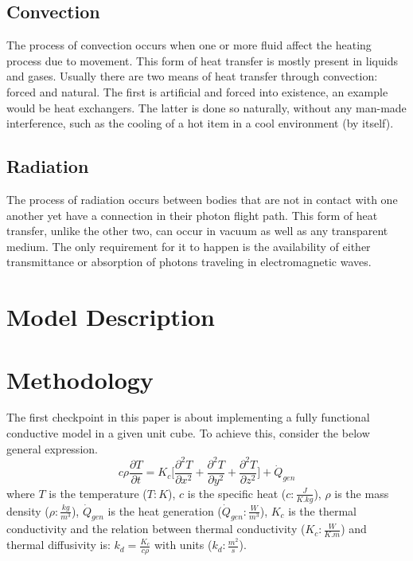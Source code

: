 \documentclass[a4paper,10pt]{IEEEtran}
\begin{document}
	\subsection{Convection}
	The process of convection occurs when one or more fluid affect the heating process due to movement. This form of heat transfer is mostly present in liquids and gases. Usually there are two means of heat transfer through convection: forced and natural. The first is artificial and forced into existence, an example would be heat exchangers. The latter is done so naturally, without any man-made interference, such as the cooling of a hot item in a cool environment (by itself). 
	\subsection{Radiation}
	The process of radiation occurs between bodies that are not in contact with one another yet have a connection in their photon flight path. This form of heat transfer, unlike the other two, can occur in vacuum as well as any transparent medium. The only requirement for it to happen is the availability of either transmittance or absorption of photons traveling in electromagnetic waves. 
	
	
	
	\section{Model Description}
	
	\section{Methodology}
	The first checkpoint in this paper is about implementing a fully functional conductive model in a given unit cube. To achieve this, consider the below general expression.
	\begin{equation}
		c\rho\frac{\partial T}{\partial t} = K_c \Bigg[ \frac{\partial^2 T}{\partial x^2} + \frac{\partial^2 T}{\partial y^2} + \frac{\partial^2 T}{\partial z^2} \Bigg] + \dot{Q}_{gen}
	\end{equation}
	where $T$ is the temperature ($T: K$), $c$ is the specific heat ($c: \frac{J}{K.kg}$), $\rho$ is the mass density ($\rho: \frac{kg}{m^3}$), $\dot{Q}_{gen}$ is the heat generation ($\dot{Q}_{gen}: \frac{W}{m^3}$), $K_c$ is the thermal conductivity and the relation between thermal conductivity ($K_c: \frac{W}{K.m}$) and thermal diffusivity is: $k_d = \frac{K_c}{c\rho}$ with units ($k_d: \frac{m^2}{s}$).
	
\end{document}
